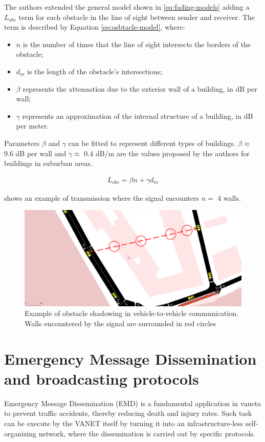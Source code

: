 		The authors extended the general model shown in \ref{eq:fading-models} adding a $L_{obs}$ term for each obstacle in the line of sight between sender and receiver. The term is described by Equation \ref{eq:osbtacle-model}, where:
		\begin{itemize}
			\item $n$ is the number of times that the line of sight intersects the borders of the obstacle;
			\item $d_m$ is the length of the obstacle's intersections;
			\item $\beta$ represents the attenuation due to the exterior wall of a building, in dB per wall;
			\item $\gamma$ represents an approximation of the internal structure of a building, in dB per meter.
		\end{itemize}
		
		
		Parameters $\beta$ and $\gamma$ can be fitted to represent different types of buildings. $\beta \approx$ 9.6 dB per wall and $\gamma \approx$ 0.4 dB/m are the values proposed by the authors for buildings in suburban areas.
		
		\begin{gather}\label{eq:osbtacle-model}
			L_{obs} = \beta n + \gamma d_m
		\end{gather}
	
		 shows an example of transmission where the signal encounters $n =$ 4 walls. 
	
		\begin{figure}[H]
			\centering
			\includegraphics[width=\textwidth]{immagini/sumo-obstacle}
			\caption{Example of obstacle shadowing in vehicle-to-vehicle communication. Walls encountered by the signal are surrounded in red circles}
			\label{fig:sumo-obstacle}
		\end{figure}
	
	\section{Emergency Message Dissemination and broadcasting protocols}
		Emergency Message Dissemination (EMD) is a fundamental application in \acrshort{vaneta} to prevent traffic accidents, thereby reducing death and injury rates. Such task can be execute by the VANET itself by turning it into an infrastructure-less self-organizing network, where the dissemination is carried out by specific protocols. 
		
